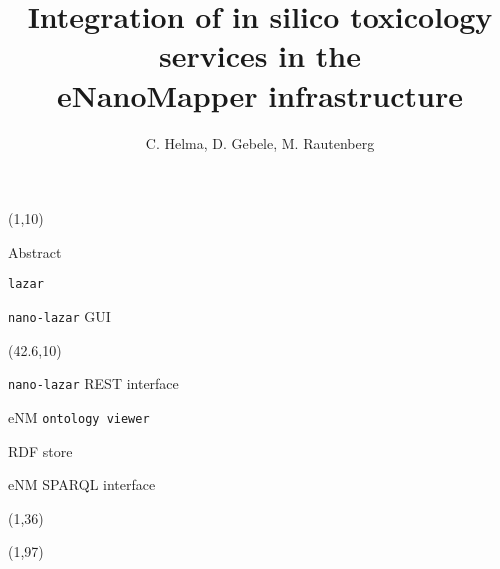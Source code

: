 \documentclass[final]{beamer}
\title{Integration of in silico toxicology services in the \\ eNanoMapper infrastructure }
\author{C. Helma, D. Gebele, M. Rautenberg}
\institute{\emph{in silico} toxicology gmbh, Basel, Switzerland}
\begin{document}
  \begin{frame}{}

    \begin{textblock}{40.5}(1,10)
      \begin{block}{Abstract}
        
      \end{block}

      \begin{block}{{\tt lazar} \cite{helma_2017}\cite{helma_christoph_2016_215483}}
        
      \end{block}

      \begin{block}{{\tt nano-lazar} GUI \cite{gebele_denis_2017_250818}}
        
      \end{block}

    \end{textblock}

    \begin{textblock}{40.5}(42.6,10)

      \begin{block}{{\tt nano-lazar} REST interface \cite{rautenberg_micha_2016_187328}}
        
      \end{block}

      \begin{block}{eNM {\tt ontology viewer} \cite{gebele_denis_2017_259384}}
        
      \end{block}

      \begin{block}{RDF store}
        
      \end{block}

      \begin{block}{eNM SPARQL interface}
        
      \end{block}


    \end{textblock}



    \begin{textblock}{82.1}(1,36)
      
    \end{textblock}

    \begin{textblock}{40.5}(1,97)


\end{textblock}
\end{frame}
\end{document}
